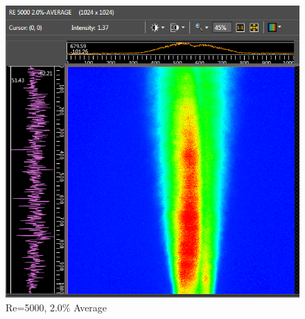\documentclass[preview,12pt]{article}
\begin{document}
\begin{figure}[h]
    \centering
    \includegraphics[width=0.55\linewidth]{RE-5000-20-Avg.PNG}
    \caption{{\footnotesize Re=5000, 2.0\% Average}}
\end{figure}
\end{document}
